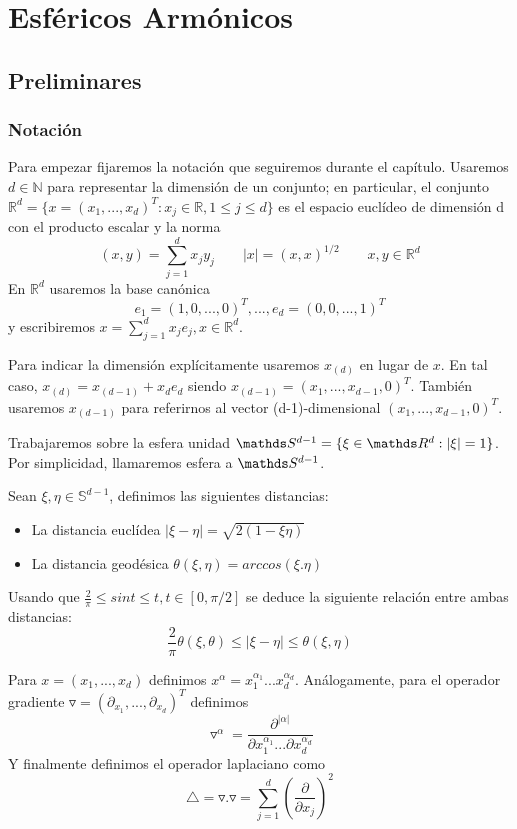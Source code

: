 
\chapter[Esféricos Armónicos]
        {Esféricos Armónicos}
\section{Preliminares}
\subsection{Notación}
Para empezar fijaremos la notación que seguiremos durante el capítulo. Usaremos $d\in\mathds{N}$ para representar la dimensión de un conjunto; en particular, el conjunto $\mathds{R}^d = \{x=(x_1,...,x_d)^T : x_j\in\mathds{R},1 \le j \le d\}$ es el espacio euclídeo de dimensión d con el producto escalar y la norma
$$
(x,y) = \sum_{j=1}^{d} x_jy_j  \qquad |x|=(x,x)^{1/2}  \qquad x,y\in\mathds{R}^d
$$
En $\mathds{R}^d$ usaremos la base canónica
$$
e_1=(1,0,...,0)^T, ..., e_d=(0,0,...,1)^T
$$
y escribiremos $x = \sum_{j=1}^{d} x_je_j, x\in\mathds{R}^d$.
\medskip

Para indicar la dimensión explícitamente usaremos $x_{(d)}$ en lugar de $x$. En tal caso, $x_{(d)} = x_{(d-1)}+x_de_d$ siendo $x_{(d-1)}=(x_1,...,x_{d-1},0)^T$. También usaremos $x_{(d-1)}$ para referirnos al vector (d-1)-dimensional $(x_1,...,x_{d-1},0)^T$.
\medskip

Trabajaremos sobre la esfera unidad $\sphere = \{\xi\in\R : |\xi| = 1\}$. Por simplicidad, llamaremos esfera a $\sphere$.
\begin{defn} Sean $\xi,\eta\in\mathds{S}^{d-1}$, definimos las siguientes distancias:
	\begin{itemize}
		\item La distancia euclídea $|\xi-\eta| = \sqrt{2(1-\xi\eta)}$
		\item La distancia geodésica $\theta(\xi,\eta)=arccos(\xi.\eta)$
	\end{itemize}	
\end{defn}

\begin{rem}Usando que $\frac{2}{\pi} \le sin t \le t,       t\in[0,\pi/2]$ se deduce la siguiente relación entre ambas distancias:
	$$
	\frac{2}{\pi}\theta(\xi,\theta) \le |\xi - \eta| \le \theta(\xi,\eta)
	$$ 
\end{rem}

Para $x =(x_1,...,x_d)$ definimos $x^\alpha = x_1^{\alpha_1}...x_d^{\alpha_d}$. Análogamente,
para el operador gradiente $\triangledown = (\partial_{x_1},...,\partial_{x_d})^T$ definimos
$$
	\triangledown^\alpha = \frac{\partial^{|\alpha|}}{\partial x_1^{\alpha_1}...\partial x_d^{\alpha_d}}
$$
Y finalmente definimos el operador laplaciano como
$$
	\triangle = \triangledown.\triangledown = \sum_{j=1}^{d}(\frac{\partial}{\partial x_j})^2
$$


